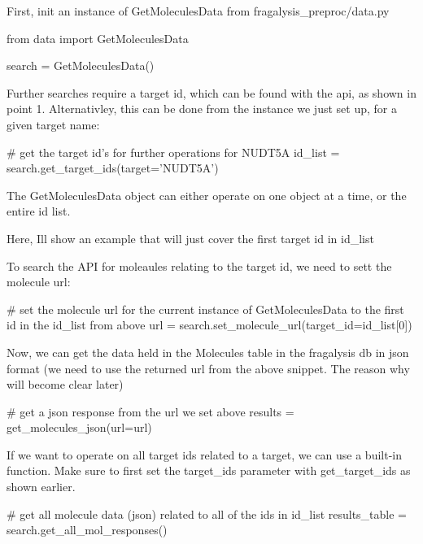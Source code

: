 First, init an instance of Get\+Molecules\+Data from fragalysis\+\_\+preproc/data.\+py


\begin{DoxyCode}
from data import GetMoleculesData

search = GetMoleculesData()
\end{DoxyCode}


Further searches require a target id, which can be found with the api, as shown in point 1. Alternativley, this can be done from the instance we just set up, for a given target name\+:


\begin{DoxyCode}
# get the target id's for further operations for NUDT5A
id\_list = search.get\_target\_ids(target='NUDT5A')
\end{DoxyCode}


The Get\+Molecules\+Data object can either operate on one object at a time, or the entire id list.

Here, I\textquotesingle{}ll show an example that will just cover the first target id in {\ttfamily id\+\_\+list}

To search the A\+PI for moleaules relating to the target id, we need to sett the molecule url\+:


\begin{DoxyCode}
# set the molecule url for the current instance of GetMoleculesData to the first id in the id\_list from
       above
url = search.set\_molecule\_url(target\_id=id\_list[0])
\end{DoxyCode}


Now, we can get the data held in the Molecules table in the fragalysis db in json format (we need to use the returned url from the above snippet. The reason why will become clear later)


\begin{DoxyCode}
# get a json response from the url we set above
results = get\_molecules\_json(url=url)
\end{DoxyCode}


If we want to operate on all target id\textquotesingle{}s related to a target, we can use a built-\/in function. Make sure to first set the target\+\_\+ids parameter with {\ttfamily get\+\_\+target\+\_\+ids} as shown earlier.


\begin{DoxyCode}
# get all molecule data (json) related to all of the ids in id\_list
results\_table = search.get\_all\_mol\_responses()
\end{DoxyCode}


